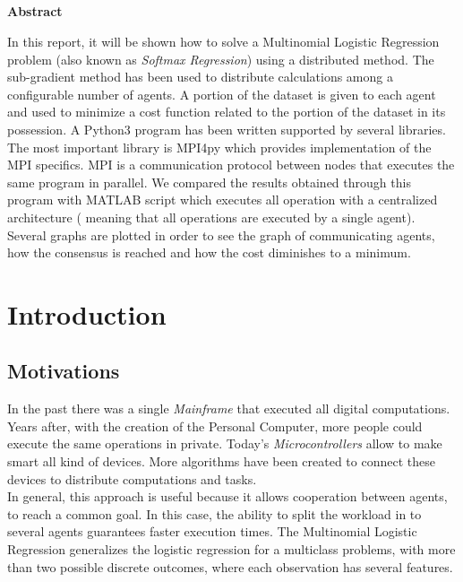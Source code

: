 \documentclass[a4paper,11pt,oneside]{book}
\begin{document}
\pagestyle{myheadings}



\newpage
\thispagestyle{empty}

\begin{center}
\chapter*{}
\thispagestyle{empty}
{\Huge \textbf{Abstract}}\\
\vspace{15mm}
\end{center}
In this report, it will be shown how to solve a Multinomial Logistic Regression problem (also known as \textit{Softmax Regression}) using a distributed method. The sub-gradient method has been used to distribute calculations among a configurable number of agents. A portion of the dataset is given to each agent and used to minimize a cost function related to the portion of the dataset in its possession.
A Python3 program has been written supported by several libraries. The most important library is MPI4py which provides implementation of the MPI specifics. MPI is a communication protocol between nodes that executes the same program in parallel. We compared the results obtained through this program with MATLAB script which executes all operation with  a centralized architecture ( meaning that all operations are executed by a single agent).\\
Several graphs are plotted in order to see the graph of communicating agents, how the consensus is reached and how the cost diminishes to a minimum.


\tableofcontents \thispagestyle{empty}
\listoffigures\thispagestyle{empty}

\chapter*{Introduction}

\section*{Motivations}
In the past there was a single \textit{Mainframe} that executed all digital computations. Years after, with the creation of the Personal Computer, more people could execute the same operations in private. Today's \textit{Microcontrollers} allow to make smart all kind of devices. More algorithms have been created to connect these devices to distribute computations and tasks.\\
 In general, this approach is useful because it allows cooperation between agents, to reach a common goal. In this case, the ability to split the workload in to several agents guarantees faster execution times.
The Multinomial Logistic Regression generalizes the logistic regression for a multiclass problems, with more than two possible discrete outcomes, where each observation has several features.
\end{document}
